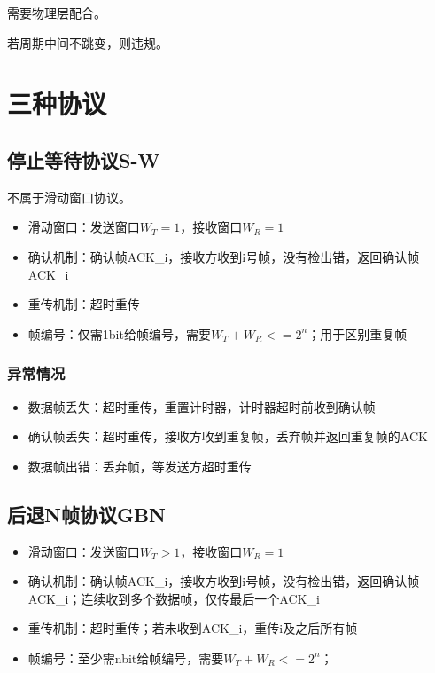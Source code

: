 需要物理层配合。

若周期中间不跳变，则违规。



\section{三种协议}

\subsection{停止等待协议S-W}
不属于滑动窗口协议。
\begin{itemize}
    \item 滑动窗口：发送窗口\(W_T = 1\)，接收窗口\(W_R = 1\)
    \item 确认机制：确认帧ACK\_i，接收方收到i号帧，没有检出错，返回确认帧ACK\_i
    \item 重传机制：超时重传
    \item 帧编号：仅需1bit给帧编号，需要\(W_T + W_R <= 2^n\)；用于区别重复帧
\end{itemize}

\subsubsection{异常情况}
\begin{itemize}
    \item 数据帧丢失：超时重传，重置计时器，计时器超时前收到确认帧
    \item 确认帧丢失：超时重传，接收方收到重复帧，丢弃帧并返回重复帧的ACK
    \item 数据帧出错：丢弃帧，等发送方超时重传
\end{itemize}


\subsection{后退N帧协议GBN}
\begin{itemize}
    \item 滑动窗口：发送窗口\(W_T > 1\)，接收窗口\(W_R = 1\)
    \item 确认机制：确认帧ACK\_i，接收方收到i号帧，没有检出错，返回确认帧ACK\_i；连续收到多个数据帧，仅传最后一个ACK\_i
    \item 重传机制：超时重传；若未收到ACK\_i，重传i及之后所有帧
    \item 帧编号：至少需nbit给帧编号，需要\(W_T + W_R <= 2^n\)；
\end{itemize}


